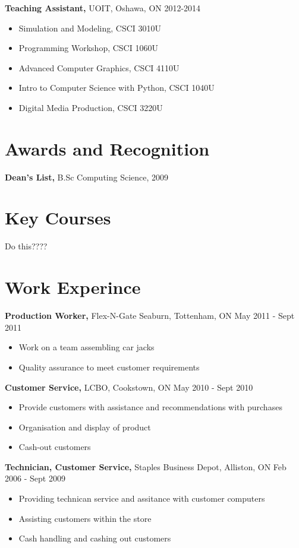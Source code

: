 \documentclass[margin]{res}
\begin{document}
\begin{resume}
	 {\bf Teaching Assistant,} UOIT, Oshawa, ON \hfill   2012-2014
            \begin{itemize} \itemsep -2pt
            \item  Simulation and Modeling, CSCI 3010U   
            \item Programming Workshop, CSCI 1060U
	 \item Advanced Computer Graphics, CSCI 4110U
	 \item Intro to Computer Science with Python, CSCI 1040U
	 \item Digital Media Production, CSCI 3220U
	 \end{itemize}

\section{Awards and Recognition}
	{\bf Dean's List,} B.Sc Computing Science, 2009

\section{Key Courses}
	Do this????

\section{Work Experince}
	{\bf Production Worker,} Flex-N-Gate Seaburn, Tottenham, ON \hfill May 2011 - Sept 2011
	\begin{itemize} \itemsep -2pt
	\item Work on a team assembling car jacks
	\item Quality assurance to meet customer requirements
	\end{itemize}

	{\bf Customer Service,} LCBO, Cookstown, ON \hfill May 2010 - Sept 2010
	\begin{itemize} \itemsep -2pt
	\item Provide customers with assistance and recommendations with purchases
	\item Organisation and display of product
	\item Cash-out customers
	\end{itemize}

	{\bf Technician, Customer Service,} Staples Business Depot, Alliston, ON \hfill Feb 2006 - Sept 2009
	\begin{itemize} \itemsep -2pt
	\item Providing technican service and assitance with customer computers
	\item Assisting customers within the store
	\item Cash handling and cashing out customers
	\end{itemize}


\end{resume}
\end{document}
